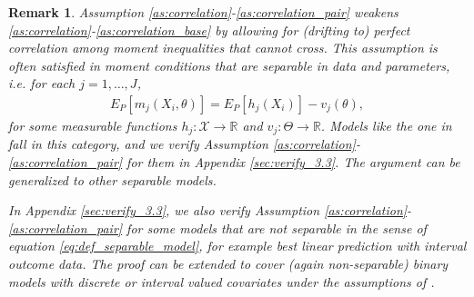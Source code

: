 \documentclass[letterpaper,11pt]{article}
\theoremstyle{myplain}
\theoremstyle{mydefinition}
\theoremstyle{myremark}
\newtheorem{remark}{Remark}[section]
\renewcommand{\cite}{\citet}
\newcommand{\R}{\mathbb{R}}
\newcommand{\cX}{\mathcal{X}}
\numberwithin{equation}{section}
\numberwithin{figure}{section}
\begin{document}
\begin{appendices}
\begin{remark}\label{rem:verify_4_3:separable}
Assumption \ref{as:correlation}-\ref{as:correlation_pair} weakens \ref{as:correlation}-\ref{as:correlation_base} by allowing for (drifting to) perfect correlation among moment inequalities that cannot cross. This assumption is often satisfied in moment conditions that are separable in data and parameters, i.e. for each $j=1,\dots,J$,
\begin{align}
E_P[m_j(X_i,\theta)] = E_P[h_j(X_i)]-v_j(\theta),\label{eq:def_separable_model}
\end{align}
for some measurable functions $h_j:\cX \rightarrow \R$ and $v_j:\Theta \rightarrow \R$. Models like the one in \cite{CilibertoTamer09} fall in this category, and we verify Assumption \ref{as:correlation}-\ref{as:correlation_pair} for them in Appendix \ref{sec:verify_3.3}. The argument can be generalized to other separable models. 

In Appendix \ref{sec:verify_3.3}, we also verify Assumption \ref{as:correlation}-\ref{as:correlation_pair} for some models that are not separable in the sense of equation \eqref{eq:def_separable_model}, for example best linear prediction with interval outcome data. The proof can be extended to cover (again non-separable) binary models with discrete or interval valued covariates under the assumptions of \cite{mag:mau08}.
\end{remark}  


\end{appendices}
\end{document}
